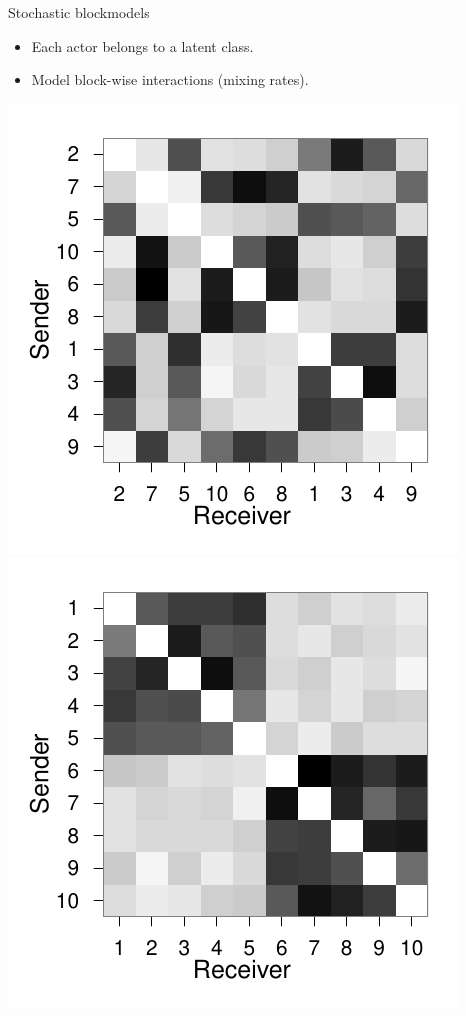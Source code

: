 \documentclass{beamer}
\begin{document}
\begin{frame}{Stochastic blockmodels}

\begin{itemize}
\item Each actor belongs to a latent class. 
\item Model block-wise interactions (mixing rates).
\end{itemize}

\includegraphics[scale=.5]{../../figs/synthetic/unsorted}
\includegraphics[scale=.5]{../../figs/synthetic/mat}

\end{frame}
\end{document}
